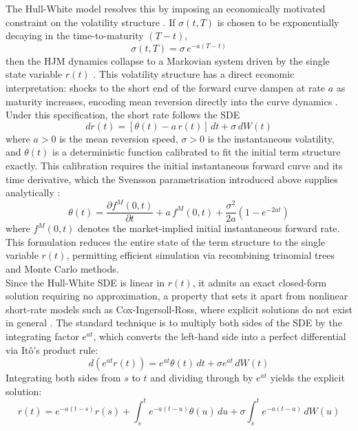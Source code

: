     \noindent
    The Hull-White model resolves this by imposing an economically motivated constraint on the volatility structure \cite{Hull_2018}. If $\sigma(t,T)$ is chosen to be exponentially decaying in the time-to-maturity $(T-t)$,
    \begin{equation}
        \sigma(t,T) = \sigma\,e^{-a(T-t)}
    \end{equation}
    then the HJM dynamics collapse to a Markovian system driven by the single state variable $r(t)$ \cite{kwok2008mathematical}. This volatility structure has a direct economic interpretation: shocks to the short end of the forward curve dampen at rate $a$ as maturity increases, encoding mean reversion directly into the curve dynamics \cite{gupta2005pricing}. Under this specification, the short rate follows the SDE
    \begin{equation}
        dr(t) = [\theta(t) - a\,r(t)]\,dt + \sigma\,dW(t)
    \end{equation}
    where $a > 0$ is the mean reversion speed, $\sigma > 0$ is the instantaneous volatility, and $\theta(t)$ is a deterministic function calibrated to fit the initial term structure exactly. This calibration requires the initial instantaneous forward curve and its time derivative, which the Svensson parametrisation introduced above supplies analytically \cite{brigo2001interest}:
    \begin{equation}\label{eq:theta}
        \theta(t) = \frac{\partial f^M(0,t)}{\partial t} + a\,f^M(0,t)
                  + \frac{\sigma^2}{2a}\!\left(1 - e^{-2at}\right)
    \end{equation}
    where $f^M(0,t)$ denotes the market-implied initial instantaneous forward rate. This formulation reduces the entire state of the term structure to the single variable $r(t)$, permitting efficient simulation via recombining trinomial trees and Monte Carlo methods. \\

    \noindent
    Since the Hull-White SDE is linear in $r(t)$, it admits an exact closed-form solution requiring no approximation, a property that sets it apart from nonlinear short-rate models such as Cox-Ingersoll-Ross, where explicit solutions do not exist in general \cite{brigo2001interest}. The standard technique is to multiply both sides of the SDE by the integrating factor $e^{at}$, which converts the left-hand side into a perfect differential via It\^{o}'s product rule:
    \begin{equation}
        d\!\left(e^{at}r(t)\right) = e^{at}\theta(t)\,dt + \sigma e^{at}\,dW(t)
    \end{equation}
    Integrating both sides from $s$ to $t$ and dividing through by $e^{at}$ yields the explicit solution:
    \begin{equation}\label{eq:hw-solution}
        r(t) = e^{-a(t-s)}r(s) + \int_s^t e^{-a(t-u)}\theta(u)\,du
               + \sigma\int_s^t e^{-a(t-u)}\,dW(u)
    \end{equation}

